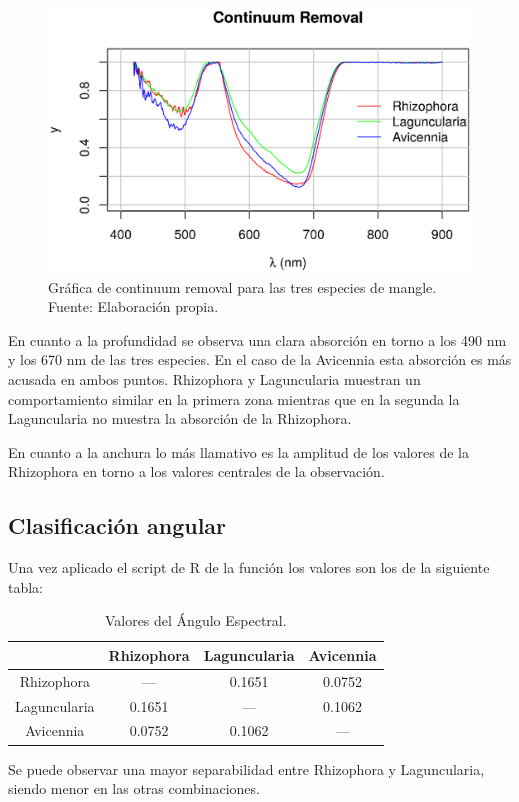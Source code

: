 \begin{figure}
	\centering
	\includegraphics[width=0.8\linewidth]{./Imagenes/ContinuumR.eps}
	\caption[Gráfica de Continuum Removal]{Gráfica de continuum removal para las tres especies de mangle. Fuente: Elaboración propia.}
	\label{fig:GraficaCR}
\end{figure}

En cuanto a la profundidad se observa una clara absorción en torno a los 490 nm y los 670 nm de las tres especies. En el caso de la Avicennia esta absorción es más acusada en ambos puntos. Rhizophora y Laguncularia muestran un comportamiento similar en la primera zona mientras que en la segunda la Laguncularia no muestra la absorción de la Rhizophora.\Sep

En cuanto a la anchura lo más llamativo es la amplitud de los valores de la Rhizophora en torno a los valores centrales de la observación.

\subsection{Clasificación angular}
Una vez aplicado el script de R de la función los valores son los de la siguiente tabla:

\begin{table}[ht]
	\centering
	\caption[Valores de Ángulo Espectral]{Valores del Ángulo Espectral.}
	\begin{tabular}{|c|c|c|c|}
	\hline
	& Rhizophora & Laguncularia & Avicennia \\
	\hline
	Rhizophora & --- & 0.1651 & 0.0752 \\
	\hline
	Laguncularia & 0.1651 & --- & 0.1062 \\
	\hline
	Avicennia & 0.0752 & 0.1062 & --- \\
	\hline
	\end{tabular}
\end{table}

Se puede observar una mayor separabilidad entre Rhizophora y Laguncularia, siendo menor en las otras combinaciones.